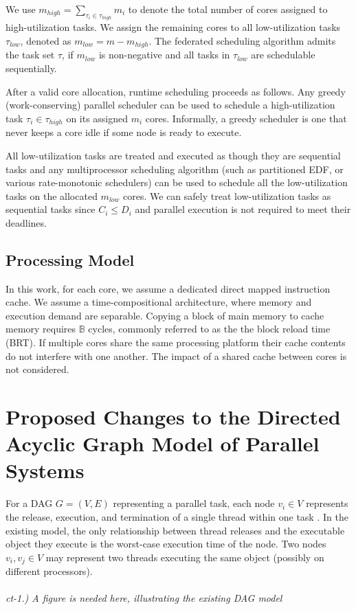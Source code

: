 We use $m_{high} = \sum_{\tau_i \in \tau_{high}} m_i$ to denote the total
number of cores assigned to high-utilization tasks. We assign
the remaining cores to all low-utilization tasks $\tau_{low}$, denoted
as ${m_{low} = m - m_{high}}$. The federated scheduling algorithm admits
the task set ${\tau}$, if $m_{low}$ is non-negative and all tasks in
$\tau_{low}$ are schedulable sequentially.  

After a valid core allocation, runtime scheduling proceeds as
follows. Any greedy (work-conserving) parallel scheduler can be used
to schedule a high-utilization task $\tau_i \in \tau_{high}$ on its
assigned $m_i$ cores. Informally, a greedy scheduler is one that never
keeps a core idle if some node is ready to execute. 

All low-utilization tasks are treated and executed as though they are
sequential tasks and any multiprocessor scheduling algorithm (such as
partitioned EDF, or various rate-monotonic schedulers) can be used to
schedule all the low-utilization tasks on the allocated $m_{low}$
cores. We can safely treat low-utilization tasks as sequential tasks
since $C_i \le D_i$ and parallel execution is not required to meet their
deadlines. 

\subsection{Processing Model}

In this work, for each core, we assume a dedicated direct mapped
instruction cache. We assume a time-compositional architecture\addcite,
where memory and execution demand are separable. Copying a block of 
main memory to cache memory requires ${\mathbb{B}}$ cycles, commonly
referred to as the the block reload time (BRT). If multiple cores share
the same processing platform their cache contents do not interfere with
one another. The impact of a shared cache between cores is not considered.


\section{Proposed Changes to the Directed Acyclic Graph Model of Parallel Systems}

For a DAG ${G = (V, E)}$ representing a parallel task, each node ${v_i \in V}$ represents
the release, execution, and termination of a single thread within one task 
\addcite. In the existing model, the only relationship between thread releases and the executable object they execute is the worst-case execution time of the node. Two nodes ${v_i, v_j \in V}$ may represent two threads executing the same object (possibly on different processors).
\\
\\
\emph{ct-1.) A figure is needed here, illustrating the existing DAG model}
\\

